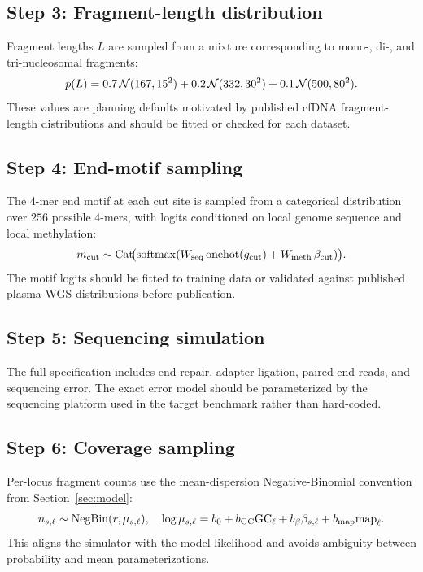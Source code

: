 \subsection*{Step 3: Fragment-length distribution}
Fragment lengths $L$ are sampled from a mixture corresponding to mono-, di-, and tri-nucleosomal fragments:
\begin{equation}
p(L) = 0.7\,\mathcal{N}(167, 15^2) + 0.2\,\mathcal{N}(332, 30^2) + 0.1\,\mathcal{N}(500, 80^2).
\end{equation}
These values are planning defaults motivated by published cfDNA fragment-length distributions and should be fitted or checked for each dataset.

\subsection*{Step 4: End-motif sampling}
The 4-mer end motif at each cut site is sampled from a categorical distribution over $256$ possible 4-mers, with logits conditioned on local genome sequence and local methylation:
\begin{equation}
m_{\mathrm{cut}} \sim \mathrm{Cat}\!\big(\mathrm{softmax}(W_{\mathrm{seq}}\,\mathrm{onehot}(g_{\mathrm{cut}}) + W_{\mathrm{meth}}\,\beta_{\mathrm{cut}})\big).
\end{equation}
The motif logits should be fitted to training data or validated against published plasma WGS distributions before publication.

\subsection*{Step 5: Sequencing simulation}
The full specification includes end repair, adapter ligation, paired-end reads, and sequencing error. The exact error model should be parameterized by the sequencing platform used in the target benchmark rather than hard-coded.

\subsection*{Step 6: Coverage sampling}
Per-locus fragment counts use the mean-dispersion Negative-Binomial convention from Section~\ref{sec:model}:
\begin{equation}
n_{s,\ell}\sim\mathrm{NegBin}(r,\mu_{s,\ell}),\quad \log\mu_{s,\ell}=b_0+b_{\mathrm{GC}}\mathrm{GC}_\ell+b_\beta\beta_{s,\ell}+b_{\mathrm{map}}\mathrm{map}_\ell.
\end{equation}
This aligns the simulator with the model likelihood and avoids ambiguity between probability and mean parameterizations.

